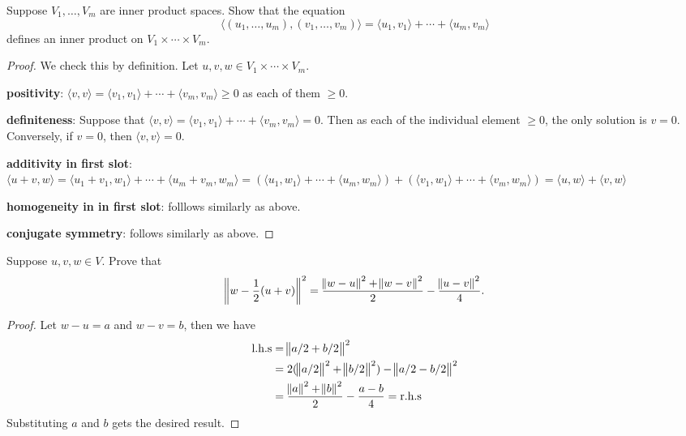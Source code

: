 \documentclass{extarticle}
\begin{document}
\begin{problem}{29}
    Suppose \(V_1, \ldots, V_m\) are inner product spaces. Show that the equation 
    \[\langle (u_1, \ldots, u_m), (v_1, \ldots, v_m) \rangle = \langle u_1,v_1 \rangle 
    + \cdots + \langle u_m,v_m \rangle\]
    defines an inner product on \(V_1 \times \cdots \times V_m\).
\end{problem}

\begin{proof}
We check this by definition. Let \(u, v, w \in V_1 \times \cdots \times V_m\). 

\textbf{positivity}: \(\langle v,v \rangle 
= \langle v_1,v_1 \rangle + \cdots + \langle v_m,v_m \rangle \geq 0 \) 
as each of them \(\geq 0\). 

\textbf{definiteness}: Suppose that \(\langle v,v \rangle 
= \langle v_1,v_1 \rangle + \cdots + \langle v_m,v_m \rangle = 0 \). Then as each of the individual 
element \(\geq 0\), the only solution is \(v = 0\). Conversely, if \(v = 0\), then \(\langle v,v \rangle = 0\). 

\textbf{additivity in first slot}: \(\langle u+v,w \rangle 
= \langle u_1 + v_1, w_1 \rangle + \cdots + \langle u_m + v_m, w_m \rangle 
= (\langle u_1,w_1 \rangle + \cdots + \langle u_m,w_m \rangle) 
+ (\langle v_1,w_1 \rangle + \cdots + \langle v_m,w_m \rangle) 
= \langle u,w \rangle + \langle v,w \rangle\) 

\textbf{homogeneity in in first slot}: folllows similarly as above. 

\textbf{conjugate symmetry}: follows similarly as above. 
\end{proof}




\begin{problem}{31}
    Suppose \(u, v, w \in V\). Prove that 
    \[\norm{w - \frac{1}{2}(u+v)}^2 = \frac{\norm{w - u}^2 + \norm{w - v}^2}{2} - \frac{\norm{u-v}^2}{4}.\]
\end{problem}

\begin{proof}
Let \(w - u = a\) and \(w - v = b\), then we have 
\begin{align*}
    \text{l.h.s} 
    &= \norm{ a/2  + b/2  }^2 \\ 
    &=  2(\norm{a/2}^2 + \norm{b/2}^2) - \norm{a/2 - b/2}^2 \\ 
    &= \frac{\norm{a}^2 + \norm{b}^2}{2} - \frac{a - b}{4} = \text{r.h.s} 
\end{align*}
Substituting \(a\) and \(b\) gets the desired result. 
\end{proof}
\end{document}
